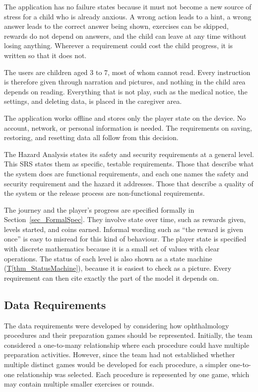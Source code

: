 \documentclass[10pt]{article}
\newcommand{\thmref}[1]{\hyperref[#1]{T\ref*{#1}}}
\begin{document}
The application has no failure states because it must not become a new 
source of stress for a child who is already anxious. A wrong
action leads to a hint, a wrong answer leads to the correct answer being
shown, exercises can be skipped, rewards do not depend on answers, and
the child can leave at any time without losing anything. Wherever a
requirement could cost the child progress, it is written so that it does not.

The users are children aged 3 to 7, most of whom cannot read. Every
instruction is therefore given through narration and pictures, and nothing in
the child area depends on reading. Everything that is not play, such as the
medical notice, the settings, and deleting data, is placed in the caregiver
area.

The application works offline and stores only the player state on the device.
No account, network, or personal information is needed. The requirements on
saving, restoring, and resetting data all follow from this decision.

The Hazard Analysis states its safety and security requirements at a general
level. This SRS states them as specific, testable requirements. Those that
describe what the system does are functional requirements, and each one names
the safety and security requirement and the hazard it addresses. Those that
describe a quality of the system or the release process are non-functional
requirements.

The journey and the player's progress are specified formally in
Section~\ref{sec_FormalSpec}. They involve state over time, such as rewards
given, levels started, and coins earned. Informal wording such as ``the reward
is given once'' is easy to misread for this kind of behaviour. The player
state is specified with discrete mathematics because it is a small set of
values with clear operations. The status of each level is also shown as a
state machine (\thmref{thm_StatusMachine}), because it is easiest to check as
a picture. Every requirement can then cite exactly the part of the model it
depends on.

\subsection{Data Requirements}

The data requirements were developed by considering how
ophthalmology procedures and their preparation games should
be represented. Initially, the team considered a one-to-many relationship where each procedure could have multiple
preparation activities. However, since the team had not established
whether multiple distinct games would be developed for
each procedure, a simpler one-to-one relationship was selected.
Each procedure is represented by one game, which may contain
multiple smaller exercises or rounds.
\end{document}
